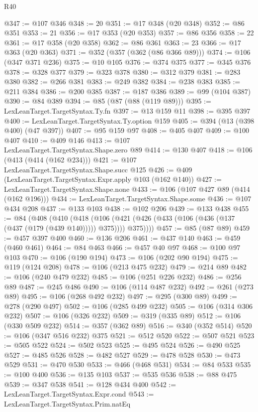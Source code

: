 \begin{lexlean}{R40}
\begin{coremodule}
@347 := @107 @346
@348 := 20
@351 := @17 @348 (@20 @348)
@352 := @86 @351
@353 := 21
@356 := @17 @353 (@20 @353)
@357 := @86 @356
@358 := 22
@361 := @17 @358 (@20 @358)
@362 := @86 @361
@363 := 23
@366 := @17 @363 (@20 @363)
@371 := @352 (@357 (@362 (@86 @366 @89)))
@374 := @106 (@347 @371 @236)
@375 := @10 @105
@376 := @374 @375
@377 := @345 @376
@378 := @328 @377
@379 := @323 @378
@380 := @312 @379
@381 := @283 @380
@382 := @266 @381
@383 := @249 @382
@384 := @238 @383
@385 := @211 @384
@386 := @200 @385
@387 := @187 @386
@389 := @99 (@104 @387)
@390 := @84 @389
@394 := @85 (@87 (@88 (@119 @89)))
@395 := LexLeanTarget.TargetSyntax.Ty.fn
@397 := @13 @159 @11
@398 := @395 @397
@400 := LexLeanTarget.TargetSyntax.Ty.option @159
@405 := @394 (@13 (@398 @400) (@47 @397))
@407 := @95 @159 @97
@408 := @405 @407
@409 := @100 @407
@410 := @409 @146
@413 := @107 LexLeanTarget.TargetSyntax.Shape.zero @89
@414 := @130 @407
@418 := @106 (@413 (@414 (@162 @234)))
@421 := @107 LexLeanTarget.TargetSyntax.Shape.succ @125
@426 := @409 (LexLeanTarget.TargetSyntax.Expr.apply @103 (@162 @140))
@427 := LexLeanTarget.TargetSyntax.Shape.none
@433 := @106 (@107 @427 @89 (@414 (@162 @196)))
@434 := LexLeanTarget.TargetSyntax.Shape.some
@436 := @107 @434 @208
@437 := @133 @103
@438 := @102 @206
@439 := @133 @438
@455 := @84
    (@408
      (@410
        (@418
          (@106 (@421 (@426 (@433 (@106 (@436 (@137 (@437 (@179 (@439 @140))))) @375)))) @375))))
@457 := @85 (@87 @89)
@459 := @457 @397 @400
@460 := @136 @206
@461 := @437 @140
@463 := @459 (@460 @461)
@464 := @84 @463
@466 := @457 @40 @97
@468 := @100 @97 @103
@470 := @106 (@190 @194)
@473 := @106 (@202 @90 @194)
@475 := @119 (@124 @208)
@478 := @106 (@213 @475 @232)
@479 := @214 @89
@482 := @106 (@240 @479 @232)
@485 := @106 (@251 @226 @232)
@486 := @256 @89
@487 := @245 @486
@490 := @106 (@114 @487 @232)
@492 := @261 (@273 @89)
@495 := @106 (@268 @492 @232)
@497 := @295 (@300 @89)
@499 := @278 (@290 @497)
@502 := @106 (@285 @499 @232)
@505 := @106 (@314 @306 @232)
@507 := @106 (@326 @232)
@509 := @319 (@335 @89)
@512 := @106 (@330 @509 @232)
@514 := @357 (@362 @89)
@516 := @340 (@352 @514)
@520 := @106 (@347 @516 @232) @375
@521 := @512 @520
@522 := @507 @521
@523 := @505 @522
@524 := @502 @523
@525 := @495 @524
@526 := @490 @525
@527 := @485 @526
@528 := @482 @527
@529 := @478 @528
@530 := @473 @529
@531 := @470 @530
@533 := @466 (@468 @531)
@534 := @84 @533
@535 := @100 @400
@536 := @135 @103
@537 := @535 @536
@538 := @88 @475
@539 := @347 @538
@541 := @128 @434 @400
@542 := LexLeanTarget.TargetSyntax.Expr.cond
@543 := LexLeanTarget.TargetSyntax.Prim.natEq

\end{coremodule}
\end{lexlean}
